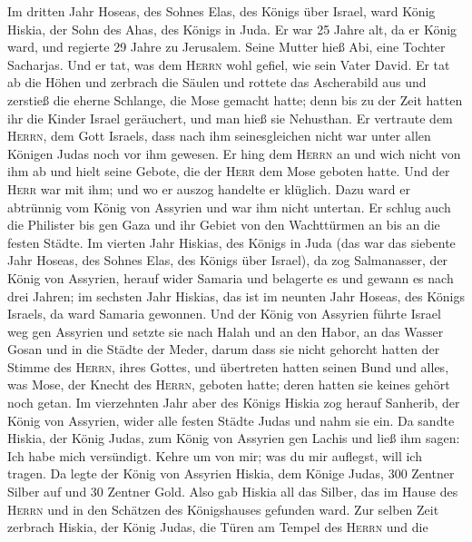  Im dritten Jahr Hoseas, des Sohnes Elas, des Königs über
Israel, ward König Hiskia, der Sohn des Ahas, des Königs in Juda.
 Er war 25 Jahre alt, da er König ward, und regierte 29
Jahre zu Jerusalem. Seine Mutter hieß Abi, eine Tochter Sacharjas.
 Und er tat, was dem \textsc{Herrn} wohl gefiel, wie sein
Vater David.  Er tat ab die Höhen und zerbrach die Säulen
und rottete das Ascherabild aus und zerstieß die eherne Schlange, die
Mose gemacht hatte; denn bis zu der Zeit hatten ihr die Kinder Israel
geräuchert, und man hieß sie Nehusthan.  Er vertraute dem
\textsc{Herrn}, dem Gott Israels, dass nach ihm seinesgleichen nicht war
unter allen Königen Judas noch vor ihm gewesen.  Er hing
dem \textsc{Herrn} an und wich nicht von ihm ab und hielt seine Gebote,
die der \textsc{Herr} dem Mose geboten hatte.  Und der
\textsc{Herr} war mit ihm; und wo er auszog handelte er klüglich. Dazu
ward er abtrünnig vom König von Assyrien und war ihm nicht untertan.
 Er schlug auch die Philister bis gen Gaza und ihr Gebiet
von den Wachttürmen an bis an die festen Städte.  Im
vierten Jahr Hiskias, des Königs in Juda (das war das siebente Jahr
Hoseas, des Sohnes Elas, des Königs über Israel), da zog Salmanasser,
der König von Assyrien, herauf wider Samaria und belagerte es
 und gewann es nach drei Jahren; im sechsten Jahr
Hiskias, das ist im neunten Jahr Hoseas, des Königs Israels, da ward
Samaria gewonnen.  Und der König von Assyrien führte
Israel weg gen Assyrien und setzte sie nach Halah und an den Habor, an
das Wasser Gosan und in die Städte der Meder,  darum dass
sie nicht gehorcht hatten der Stimme des \textsc{Herrn}, ihres Gottes,
und übertreten hatten seinen Bund und alles, was Mose, der Knecht des
\textsc{Herrn}, geboten hatte; deren hatten sie keines gehört noch
getan.  Im vierzehnten Jahr aber des Königs Hiskia zog
herauf Sanherib, der König von Assyrien, wider alle festen Städte Judas
und nahm sie ein.  Da sandte Hiskia, der König Judas, zum
König von Assyrien gen Lachis und ließ ihm sagen: Ich habe mich
versündigt. Kehre um von mir; was du mir auflegst, will ich tragen. Da
legte der König von Assyrien Hiskia, dem Könige Judas, 300 Zentner
Silber auf und 30 Zentner Gold.  Also gab Hiskia all das
Silber, das im Hause des \textsc{Herrn} und in den Schätzen des
Königshauses gefunden ward.  Zur selben Zeit zerbrach
Hiskia, der König Judas, die Türen am Tempel des \textsc{Herrn} und die
